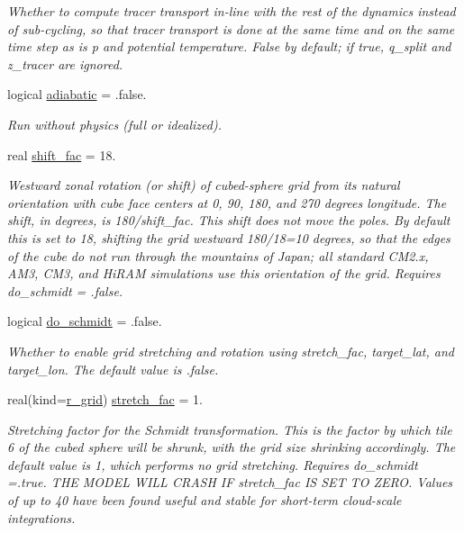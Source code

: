 \begin{DoxyCompactItemize}
\begin{DoxyCompactList}\small\item\em Whether to compute tracer transport in-\/line with the rest of the dynamics instead of sub-\/cycling, so that tracer transport is done at the same time and on the same time step as is p and potential temperature. False by default; if true, q\-\_\-split and z\-\_\-tracer are ignored. \end{DoxyCompactList}\item 
logical \hyperlink{structfv__arrays__mod_1_1fv__flags__type_a909f3113870ef34fea4078fbe8910676}{adiabatic} = .false.
\begin{DoxyCompactList}\small\item\em Run without physics (full or idealized). \end{DoxyCompactList}\item 
real \hyperlink{structfv__arrays__mod_1_1fv__flags__type_ae661493f3d099801d7487cfae6902c89}{shift\-\_\-fac} = 18.
\begin{DoxyCompactList}\small\item\em Westward zonal rotation (or shift) of cubed-\/sphere grid from its natural orientation with cube face centers at 0, 90, 180, and 270 degrees longitude. The shift, in degrees, is 180/shift\-\_\-fac. This shift does not move the poles. By default this is set to 18, shifting the grid westward 180/18=10 degrees, so that the edges of the cube do not run through the mountains of Japan; all standard C\-M2.\-x, A\-M3, C\-M3, and Hi\-R\-A\-M simulations use this orientation of the grid. Requires do\-\_\-schmidt = .false. \end{DoxyCompactList}\item 
logical \hyperlink{structfv__arrays__mod_1_1fv__flags__type_a721802f882562799a4611c17ffb3ba0c}{do\-\_\-schmidt} = .false.
\begin{DoxyCompactList}\small\item\em Whether to enable grid stretching and rotation using stretch\-\_\-fac, target\-\_\-lat, and target\-\_\-lon. The default value is .false. \end{DoxyCompactList}\item 
real(kind=\hyperlink{classfv__arrays__mod_ab0ba8527d270f349a84fa0a330be1923}{r\-\_\-grid}) \hyperlink{structfv__arrays__mod_1_1fv__flags__type_acb5e88bae05f9848ec4b18ef1f7bcd1e}{stretch\-\_\-fac} = 1.
\begin{DoxyCompactList}\small\item\em Stretching factor for the Schmidt transformation. This is the factor by which tile 6 of the cubed sphere will be shrunk, with the grid size shrinking accordingly. The default value is 1, which performs no grid stretching. Requires do\-\_\-schmidt =.true. T\-H\-E M\-O\-D\-E\-L W\-I\-L\-L C\-R\-A\-S\-H I\-F stretch\-\_\-fac I\-S S\-E\-T T\-O Z\-E\-R\-O. Values of up to 40 have been found useful and stable for short-\/term cloud-\/scale integrations. \end{DoxyCompactList}\item 

\end{DoxyCompactItemize}
